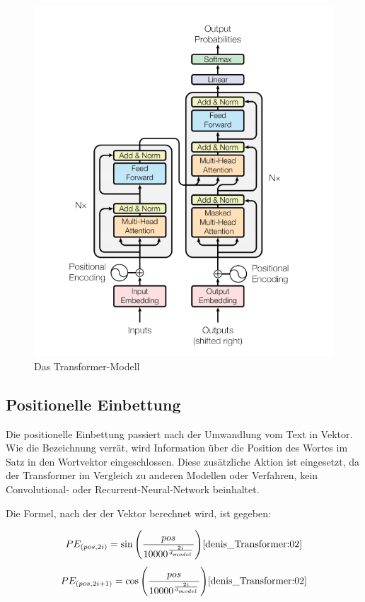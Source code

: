 \begin{figure}[H]
	\centering
	\includegraphics[scale=0.6]{images/transformer.png}
	\caption{Das Transformer-Modell \cite{Vaswani:2017}}
	\label{transformer}
\end{figure}

\subsection{Positionelle Einbettung}
Die positionelle Einbettung passiert nach der Umwandlung vom Text in Vektor. Wie die Bezeichnung verrät, wird Information über die Position des Wortes im Satz in den Wortvektor eingeschlossen. Diese zusätzliche Aktion ist eingesetzt, da der Transformer im Vergleich zu anderen Modellen oder Verfahren, kein Convolutional- oder Recurrent-Neural-Network beinhaltet.

Die Formel, nach der der Vektor berechnet wird, ist gegeben:

\begin{equation}
	PE_{(pos,2i)} = \sin\Bigg(\frac{pos}{10000^\frac{2i}{d_{model}}}\Bigg) \cite{denis_Transformer:02}
\end{equation}
\begin{equation}
	PE_{(pos,2i+1)} = \cos\Bigg(\frac{pos}{10000^\frac{2i}{d_{model}}}\Bigg) \cite{denis_Transformer:02}
\end{equation}

